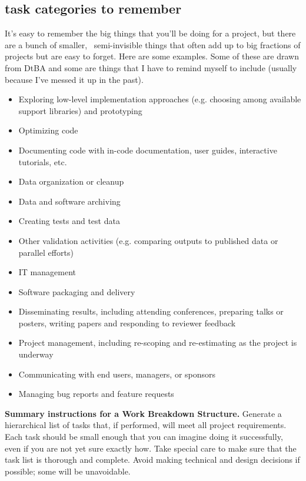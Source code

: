 \documentclass[12pt,oneside]{book}
\begin{document}
\subsection*{task categories to remember}
\label{scrivauto:31}

It's easy to remember the big things that you'll be doing for a project, but there are a bunch of smaller,  semi-invisible things that often add up to big fractions of projects but are easy to forget. Here are some examples. Some of these are drawn from DtBA and some are things that I have to remind myself to include (usually because I've messed it up in the past).
\begin{itemize}[wide, labelwidth=!, labelindent=0pt]
\item Exploring low-level implementation approaches (e.g. choosing among available support libraries) and prototyping
\item Optimizing code
\item Documenting code with in-code documentation, user guides, interactive tutorials, etc.
\item Data organization or cleanup
\item Data and software archiving
\item Creating tests and test data
\item Other validation activities (e.g. comparing outputs to published data or parallel efforts)
\item IT management
\item Software packaging and delivery
\item Disseminating results, including attending conferences, preparing talks or posters, writing papers and responding to reviewer feedback
\item Project management, including re-scoping and re-estimating as the project is underway
\item Communicating with end users, managers, or sponsors
\item Managing bug reports and feature requests
\end{itemize}

\hfill
\begin{mdframed}[everyline=true]
\textbf{Summary instructions for a Work Breakdown Structure.} Generate a hierarchical list of tasks that, if performed, will meet all project requirements. Each task should be small enough that you can imagine doing it successfully, even if you are not yet sure exactly how. Take special care to make sure that the task list is thorough and complete. Avoid making technical and design decisions if possible; some will be unavoidable.
\end{mdframed}
\end{document}
